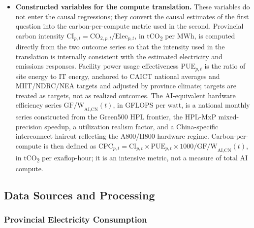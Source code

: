 \documentclass[12pt,a4paper]{article}
\begin{document}
\begin{itemize}
  \item \textbf{Constructed variables for the compute translation.}
        These variables do not enter the causal regressions; they
        convert the causal estimates of the first question into the
        carbon-per-compute metric used in the second. Provincial
        carbon intensity $\text{CI}_{p,t} = \text{CO}_{2,p,t} /
        \text{Elec}_{p,t}$, in tCO\textsubscript{2} per MWh, is
        computed directly from the two outcome series so that the
        intensity used in the translation is internally consistent
        with the estimated electricity and emissions responses.
        Facility power usage effectiveness $\text{PUE}_{p,t}$ is the
        ratio of site energy to IT energy, anchored to CAICT national
        averages and MIIT/NDRC/NEA targets and adjusted by province
        climate; targets are treated as targets, not as realized
        outcomes. The AI-equivalent hardware efficiency series
        $\text{GF/W}_{\text{AI,CN}}(t)$, in GFLOPS per watt, is a
        national monthly series constructed from the Green500 HPL
        frontier, the HPL-MxP mixed-precision speedup, a utilization
        realism factor, and a China-specific interconnect haircut
        reflecting the A800/H800 hardware regime. Carbon-per-compute
        is then defined as $\text{CPC}_{p,t} = \text{CI}_{p,t} \times
        \text{PUE}_{p,t} \times 1000 / \text{GF/W}_{\text{AI,CN}}(t)$,
        in tCO\textsubscript{2} per exaflop-hour; it is an intensive
        metric, not a measure of total AI compute.
\end{itemize}


\subsection{Data Sources and Processing}
%

\subsubsection{Provincial Electricity Consumption}
%
\end{document}
